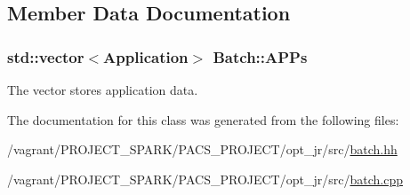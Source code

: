 \subsection{Member Data Documentation}
\hypertarget{classBatch_a757bf1a36fee46b1b47263ab4a59c560}{
\subsubsection[{A\-P\-Ps}]{\setlength{\rightskip}{0pt plus 5cm}std\-::vector$<${\bf Application}$>$ Batch\-::\-A\-P\-Ps\hspace{0.3cm}{\ttfamily [private]}}}\label{classBatch_a757bf1a36fee46b1b47263ab4a59c560}


The vector stores application data. 



The documentation for this class was generated from the following files\-:\begin{DoxyCompactItemize}
\item 
/vagrant/\-P\-R\-O\-J\-E\-C\-T\-\_\-\-S\-P\-A\-R\-K/\-P\-A\-C\-S\-\_\-\-P\-R\-O\-J\-E\-C\-T/opt\-\_\-jr/src/\hyperlink{batch_8hh}{batch.\-hh}\item 
/vagrant/\-P\-R\-O\-J\-E\-C\-T\-\_\-\-S\-P\-A\-R\-K/\-P\-A\-C\-S\-\_\-\-P\-R\-O\-J\-E\-C\-T/opt\-\_\-jr/src/\hyperlink{batch_8cpp}{batch.\-cpp}\end{DoxyCompactItemize}

